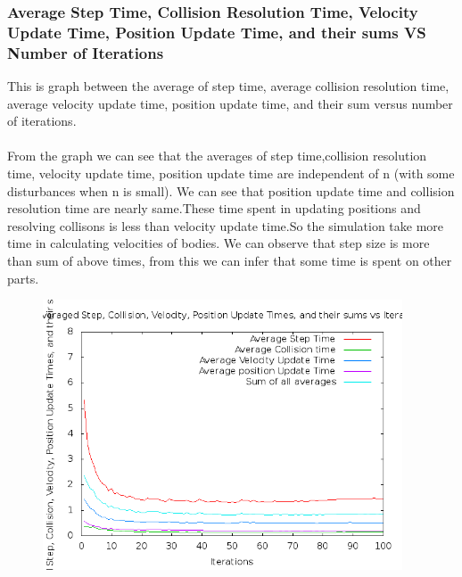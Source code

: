 \documentclass[11pt]{article}
\begin{document}
\subsubsection{Average Step Time, Collision Resolution Time, Velocity Update Time, Position Update Time, and their sums VS Number of Iterations}
This is graph between the average of step time, average collision resolution time, average velocity update time, position update time, and their sum versus number of iterations.\\ \\
From the graph we can see that the averages of step time,collision resolution time, velocity update time, position update time are independent of n (with some disturbances when n is small). We can see that position update time and collision resolution time are nearly same.These time spent in updating positions and resolving collisons is less than velocity update time.So the simulation take more time in calculating velocities of bodies. We can observe that step size is more than sum of above times, from this we can infer that some time is spent on other parts.
\begin{figure}[H]
\centering
\includegraphics[height=8cm]{g23_plot02.png}
\end{figure}
\end{document}
